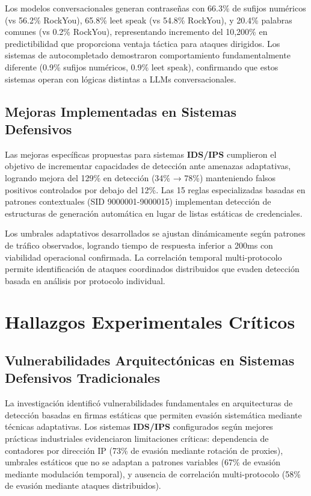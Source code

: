 Los modelos conversacionales generan contraseñas con 66.3\% de sufijos numéricos (vs 56.2\% RockYou), 65.8\% leet speak (vs 54.8\% RockYou), y 20.4\% palabras comunes (vs 0.2\% RockYou), representando incremento del 10,200\% en predictibilidad que proporciona ventaja táctica para ataques dirigidos. Los sistemas de autocompletado demostraron comportamiento fundamentalmente diferente (0.9\% sufijos numéricos, 0.9\% leet speak), confirmando que estos sistemas operan con lógicas distintas a LLMs conversacionales.

\subsection{Mejoras Implementadas en Sistemas Defensivos}

Las mejoras específicas propuestas para sistemas \textbf{IDS/IPS} cumplieron el objetivo de incrementar capacidades de detección ante amenazas adaptativas, logrando mejora del 129\% en detección (34\% → 78\%) manteniendo falsos positivos controlados por debajo del 12\%. Las 15 reglas especializadas basadas en patrones contextuales (SID 9000001-9000015) implementan detección de estructuras de generación automática en lugar de listas estáticas de credenciales.

Los umbrales adaptativos desarrollados se ajustan dinámicamente según patrones de tráfico observados, logrando tiempo de respuesta inferior a 200ms con viabilidad operacional confirmada. La correlación temporal multi-protocolo permite identificación de ataques coordinados distribuidos que evaden detección basada en análisis por protocolo individual.

\section{Hallazgos Experimentales Críticos}

\subsection{Vulnerabilidades Arquitectónicas en Sistemas Defensivos Tradicionales}

La investigación identificó vulnerabilidades fundamentales en arquitecturas de detección basadas en firmas estáticas que permiten evasión sistemática mediante técnicas adaptativas. Los sistemas \textbf{IDS/IPS} configurados según mejores prácticas industriales evidenciaron limitaciones críticas: dependencia de contadores por dirección IP (73\% de evasión mediante rotación de proxies), umbrales estáticos que no se adaptan a patrones variables (67\% de evasión mediante modulación temporal), y ausencia de correlación multi-protocolo (58\% de evasión mediante ataques distribuidos).


